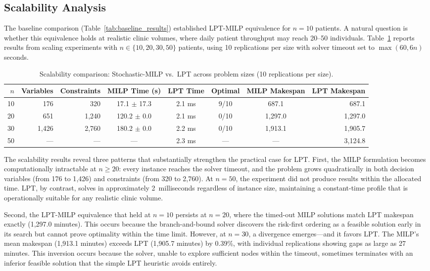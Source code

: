\documentclass[11pt,a4paper]{article}
\begin{document}
\subsection{Scalability Analysis}
\label{sec:scalability}

The baseline comparison (Table~\ref{tab:baseline_results}) established LPT-MILP equivalence for $n = 10$ patients. A natural question is whether this equivalence holds at realistic clinic volumes, where daily patient throughput may reach 20--50 individuals. Table~\ref{tab:scalability} reports results from scaling experiments with $n \in \{10, 20, 30, 50\}$ patients, using 10 replications per size with solver timeout set to $\max(60, 6n)$ seconds.

\begin{table}[H]
\centering
\caption{Scalability comparison: Stochastic-MILP vs.\ LPT across problem sizes (10 replications per size).}
\label{tab:scalability}
\begin{tabular}{@{}rrrccccr@{}}
\toprule
$n$ & Variables & Constraints & MILP Time (s) & LPT Time & Optimal & MILP Makespan & LPT Makespan \\
\midrule
10 & 176 & 320 & 17.1 $\pm$ 17.3 & 2.1 ms & 9/10 & 687.1 & 687.1 \\
20 & 651 & 1{,}240 & 120.2 $\pm$ 0.0 & 2.1 ms & 0/10 & 1{,}297.0 & 1{,}297.0 \\
30 & 1{,}426 & 2{,}760 & 180.2 $\pm$ 0.0 & 2.2 ms & 0/10 & 1{,}913.1 & 1{,}905.7 \\
50 & --- & --- & --- & 2.3 ms & --- & --- & 3{,}124.8 \\
\bottomrule
\end{tabular}
\end{table}

The scalability results reveal three patterns that substantially strengthen the practical case for LPT. First, the MILP formulation becomes computationally intractable at $n \geq 20$: every instance reaches the solver timeout, and the problem grows quadratically in both decision variables (from 176 to 1{,}426) and constraints (from 320 to 2{,}760). At $n = 50$, the experiment did not produce results within the allocated time. LPT, by contrast, solves in approximately 2~milliseconds regardless of instance size, maintaining a constant-time profile that is operationally suitable for any realistic clinic volume.

Second, the LPT-MILP equivalence that held at $n = 10$ persists at $n = 20$, where the timed-out MILP solutions match LPT makespan exactly (1{,}297.0 minutes). This occurs because the branch-and-bound solver discovers the risk-first ordering as a feasible solution early in its search but cannot prove optimality within the time limit. However, at $n = 30$, a divergence emerges---and it favors LPT. The MILP's mean makespan (1{,}913.1 minutes) exceeds LPT (1{,}905.7 minutes) by 0.39\%, with individual replications showing gaps as large as 27 minutes. This inversion occurs because the solver, unable to explore sufficient nodes within the timeout, sometimes terminates with an inferior feasible solution that the simple LPT heuristic avoids entirely.
\end{document}
